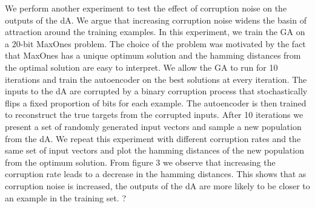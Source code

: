 \documentclass[runningheads,a4paper]{llncs}
\begin{document}
We perform another experiment to test the effect of corruption noise on the outputs of the dA. We argue that increasing corruption noise widens the basin of attraction around the training examples. In this experiment, we train the GA on a 20-bit MaxOnes problem. The choice of the problem was motivated by the fact that MaxOnes has a unique optimum solution and the hamming distances from the optimal solution are easy to interpret. We allow the GA to run for 10 iterations and train the autoencoder on the best solutions at every iteration. The inputs to the dA are corrupted by a binary corruption process that stochastically flips a fixed proportion of bits for each example. The autoencoder is then trained to reconstruct the true targets from the corrupted inputs. After 10 iterations we present a set of randomly generated input vectors and sample a new population from the dA. We repeat this experiment with different corruption rates and the same set of input vectors and  plot the hamming distances of the new population from the optimum solution. From figure 3 we observe that increasing the corruption rate leads to a decrease in the hamming distances. This shows that as corruption noise is increased, the outputs of the dA are more likely to be closer to an example in the training set. ?
\end{document}
